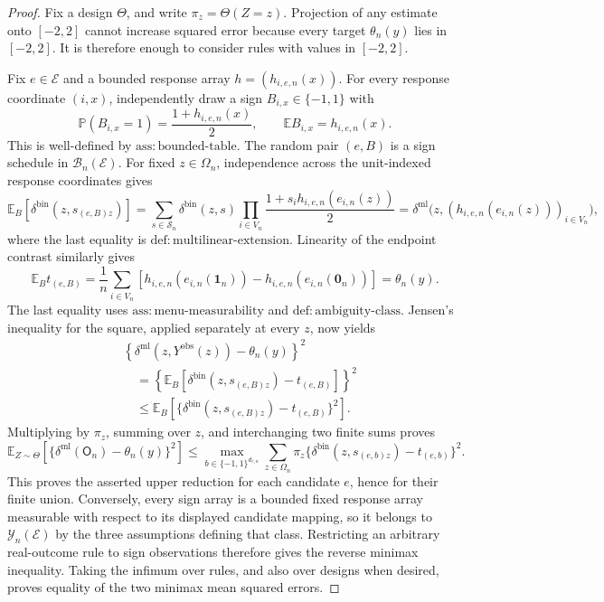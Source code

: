 \documentclass{article}
\begin{document}
\begin{proof}
Fix a design \(\Theta\), and write \(\pi_z=\Theta(Z=z)\).  Projection of any estimate onto \([-2,2]\) cannot increase squared error because every target \(\theta_n(y)\) lies in \([-2,2]\).  It is therefore enough to consider rules with values in \([-2,2]\).

Fix \(e\in\mathcal E\) and a bounded response array \(h=(h_{i,e,n}(x))\).  For every response coordinate \((i,x)\), independently draw a sign \(B_{i,x}\in\{-1,1\}\) with
\[
 \mathbb P(B_{i,x}=1)=\frac{1+h_{i,e,n}(x)}2,
 \qquad
 \mathbb E B_{i,x}=h_{i,e,n}(x).
\]
This is well-defined by \(\mathrm{ass{:}bounded\text{-}table}\).  The random pair \((e,B)\) is a sign schedule in \(\mathcal B_n(\mathcal E)\).  For fixed \(z\in\Omega_n\), independence across the unit-indexed response coordinates gives
\[
 \mathbb E_B\!\left[\delta^{\mathrm{bin}}(z,s_{(e,B)z})\right]
 =\sum_{s\in\mathcal S_n}\delta^{\mathrm{bin}}(z,s)
   \prod_{i\in V_n}\frac{1+s_i h_{i,e,n}(e_{i,n}(z))}{2}
 =\delta^{\mathrm{ml}}\bigl(z,(h_{i,e,n}(e_{i,n}(z)))_{i\in V_n}\bigr),
\]
where the last equality is \(\mathrm{def{:}multilinear\text{-}extension}\).  Linearity of the endpoint contrast similarly gives
\[
 \mathbb E_B t_{(e,B)}
 =\frac1n\sum_{i\in V_n}
   \left[h_{i,e,n}(e_{i,n}(\mathbf 1_n))-h_{i,e,n}(e_{i,n}(\mathbf 0_n))\right]
 =\theta_n(y).
\]
The last equality uses \(\mathrm{ass{:}menu\text{-}measurability}\) and \(\mathrm{def{:}ambiguity\text{-}class}\).  Jensen's inequality for the square, applied separately at every \(z\), now yields
\[
 \begin{aligned}
 &\left\{\delta^{\mathrm{ml}}(z,Y^{\mathrm{obs}}(z))-\theta_n(y)\right\}^2\\
 &\quad=\left\{\mathbb E_B[\delta^{\mathrm{bin}}(z,s_{(e,B)z})-t_{(e,B)}]\right\}^2\\
 &\quad\le \mathbb E_B\left[\{\delta^{\mathrm{bin}}(z,s_{(e,B)z})-t_{(e,B)}\}^2\right].
 \end{aligned}
\]
Multiplying by \(\pi_z\), summing over \(z\), and interchanging two finite sums proves
\[
 \mathbb E_{Z\sim\Theta}\!\left[
   \{\delta^{\mathrm{ml}}(\mathsf O_n)-\theta_n(y)\}^2\right]
 \le
 \max_{b\in\{-1,1\}^{d_{e,n}}}
 \sum_{z\in\Omega_n}\pi_z
   \{\delta^{\mathrm{bin}}(z,s_{(e,b)z})-t_{(e,b)}\}^2.
\]
This proves the asserted upper reduction for each candidate \(e\), hence for their finite union.  Conversely, every sign array is a bounded fixed response array measurable with respect to its displayed candidate mapping, so it belongs to \(\mathcal Y_n(\mathcal E)\) by the three assumptions defining that class.  Restricting an arbitrary real-outcome rule to sign observations therefore gives the reverse minimax inequality.  Taking the infimum over rules, and also over designs when desired, proves equality of the two minimax mean squared errors.
\end{proof}
\end{document}
